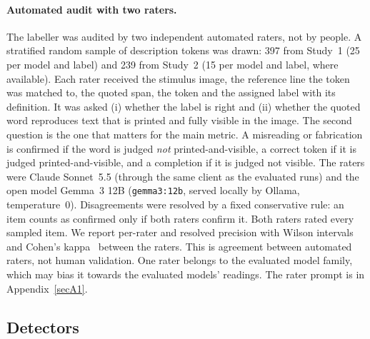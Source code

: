 \documentclass[pdflatex,sn-mathphys-num]{sn-jnl}%
\theoremstyle{thmstyleone}%
\theoremstyle{thmstyletwo}%
\theoremstyle{thmstylethree}%
\newcommand{\RealAudN}{239}
\newcommand{\SynAudN}{397}
\begin{document}
\paragraph{Automated audit with two raters.} The labeller was audited by two independent automated raters, not by people. A stratified random sample of description tokens was drawn: \SynAudN{} from Study~1 (25 per model and label) and \RealAudN{} from Study~2 (15 per model and label, where available). Each rater received the stimulus image, the reference line the token was matched to, the quoted span, the token and the assigned label with its definition. It was asked (i) whether the label is right and (ii) whether the quoted word reproduces text that is printed and fully visible in the image. The second question is the one that matters for the main metric. A misreading or fabrication is confirmed if the word is judged \emph{not} printed-and-visible, a correct token if it is judged printed-and-visible, and a completion if it is judged not visible. The raters were Claude Sonnet~5.5 (through the same client as the evaluated runs) and the open model Gemma~3 12B (\texttt{gemma3:12b}, served locally by Ollama, temperature~0). Disagreements were resolved by a fixed conservative rule: an item counts as confirmed only if both raters confirm it. Both raters rated every sampled item. We report per-rater and resolved precision with Wilson intervals and Cohen's kappa~\cite{cohen1960coefficient} between the raters. This is agreement between automated raters, not human validation. One rater belongs to the evaluated model family, which may bias it towards the evaluated models' readings. The rater prompt is in Appendix~\ref{secA1}.

\subsection{Detectors}\label{sec:detectors}
\end{document}
